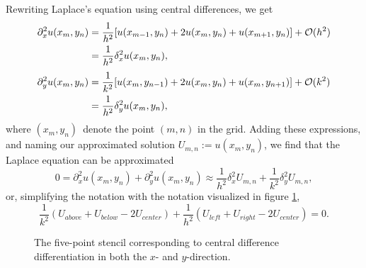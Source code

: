 Rewriting Laplace's equation using central differences, we get
\begin{equation*}
    \begin{split}
    \partial^2_x u(x_m, y_n) 
        &= \frac{1}{h^2}[u(x_{m-1},y_n) + 2u(x_m,y_n) + u(x_{m+1},y_n)] + \mathcal{O}(h^2)\\
        &= \frac{1}{h^2}\delta^2_x u(x_m,y_n),\\
    \end{split}
\end{equation*}
\begin{equation*}
    \begin{split}
    \partial^2_y u(x_m, y_n) 
        &= \frac{1}{k^2}[u(x_{m},y_{n-1}) + 2u(x_m,y_n) + u(x_{m},y_{n+1})] + \mathcal{O}(k^2)\\
        &= \frac{1}{h^2}\delta^2_y u(x_m,y_n),\\
    \end{split}
\end{equation*}
where $(x_m, y_n)$ denote the point $(m,n)$ in the grid. 
Adding these expressions, and naming our approximated solution $U_{m,n} := u(x_m,y_n)$, we find that the Laplace equation can be approximated 
\begin{equation*}
    0 = \partial^2_x u(x_m,y_n) + \partial^2_y u(x_m,y_n)
    \approx \frac{1}{h^2}\delta^2_x U_{m,n} + \frac{1}{k^2}\delta^2_y U_{m,n},
\end{equation*}
or, simplifying the notation with the notation visualized in figure \ref{ex3:fig:stencil},
\begin{equation*}
    \frac{1}{k^2}(U_{above} + U_{below} - 2U_{center}) + \frac{1}{h^2}(U_{left} + U_{right} - 2U_{center}) = 0.
\end{equation*}

\begin{figure}[hb]
    \centering
    
    \label{ex3:fig:stencil}
    \caption{The five-point stencil corresponding to central difference differentiation in both the $x$- and $y$-direction.} 
\end{figure}

